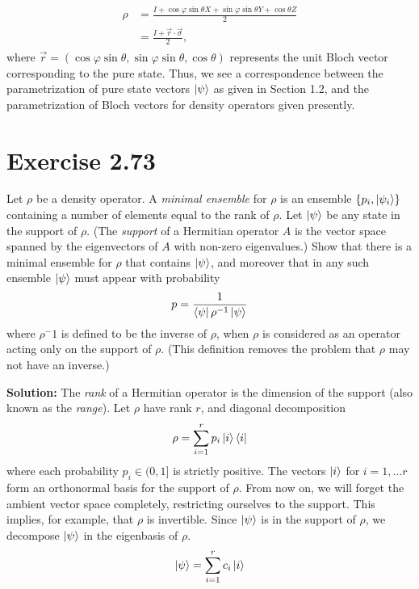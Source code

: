\documentclass{book}
\begin{document}
    \begin{align}
    \begin{aligned}
        \rho &= \frac{I + \cos\varphi \sin\theta X + \sin\varphi\sin\theta Y + \cos\theta Z}{2} \\
        &= \frac{I + \vec{r}\cdot \vec{\sigma}}{2},
    \end{aligned}
    \end{align}
    where $\vec{r} = (\cos\varphi \sin\theta, \sin\varphi\sin\theta, \cos\theta)$ represents the unit Bloch vector corresponding to the pure state. Thus, we see a correspondence between the parametrization of pure state vectors $\ket{\psi}$ as given in Section 1.2, and the parametrization of Bloch vectors for density operators given presently.

\section*{Exercise 2.73}
    Let $\rho$ be a density operator. A \emph{minimal ensemble} for $\rho$ is an ensemble $\{p_i, \ket{\psi_i}\}$ containing a number of elements equal to the rank of $\rho$. Let $\ket{\psi}$ be any state in the support of $\rho$. (The \emph{support} of a Hermitian operator $A$ is the vector space spanned by the eigenvectors of $A$ with non-zero eigenvalues.) Show that there is a minimal ensemble for $\rho$ that contains $\ket{\psi}$, and moreover that in any such ensemble $\ket{\psi}$ must appear with probability
    \begin{align}
        p = \frac{1}{\bra{\psi}\rho^{-1} \ket{\psi}}
    \end{align}
    where $\rho^-1$ is defined to be the inverse of $\rho$, when $\rho$ is considered as an operator acting only on the support of $\rho$. (This definition removes the problem that $\rho$ may not have an inverse.)

    \textbf{Solution:} The \emph{rank} of a Hermitian operator is the dimension of the support (also known as the \emph{range}). Let $\rho$ have rank $r$, and diagonal decomposition
    \begin{align}
        \rho = \sum_{i=1}^r p_i \ket{i}\bra{i}
    \end{align}
    where each probability $p_i \in (0,1]$ is strictly positive. The vectors $\ket{i}$ for $i = 1,\dots r$ form an orthonormal basis for the support of $\rho$. From now on, we will forget the ambient vector space completely, restricting ourselves to the support. This implies, for example, that $\rho$ is invertible. Since $\ket{\psi}$ is in the support of $\rho$, we decompose $\ket{\psi}$ in the eigenbasis of $\rho$.
    \begin{align} \label{eq:2.73_basis}
        \ket{\psi} = \sum_{i=1}^r c_i \ket{i}
    \end{align}
\end{document}

